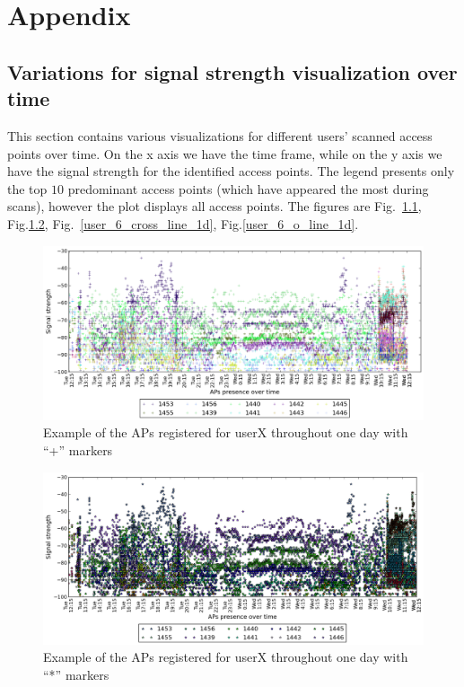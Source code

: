 \chapter{Appendix}

\section{Variations for signal strength visualization over time}
\label{appendix_signal_strength}

This section contains various visualizations for different users' scanned access
points over time. On the x axis we have the time frame, while on the y axis we
have the signal strength for the identified access points. The legend presents
only the top $10$ predominant access points (which have appeared the most
during scans), however the plot displays all access points. The figures are
Fig.~\ref{user_6_cross_1d}, Fig.\ref{user_6_star_1d},
Fig.~\ref{user_6_cross_line_1d}, Fig.\ref{user_6_o_line_1d}.

\begin{figure}[!h]
\centering
\includegraphics[height =
0.45\textwidth]{figures/cros_user_6_sorted_1days_plot.png}
\caption{Example of the APs registered for userX throughout one day with
``+'' markers}
\label{user_6_cross_1d}
\end{figure}

\begin{figure}[!h]
\centering
\includegraphics[height =
0.45\textwidth]{figures/star_user_6_sorted_1days_plot.png}
\caption{Example of the APs registered for userX throughout one day with
``*'' markers}
\label{user_6_star_1d}
\end{figure}

